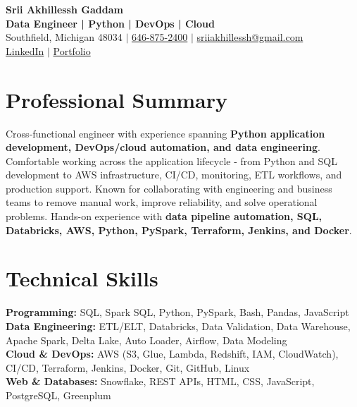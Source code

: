\documentclass[letterpaper,10pt]{article}
\begin{document}
\fontsize{9.35pt}{10.45pt}\selectfont

\begin{center}
    {\LARGE \textbf{Srii Akhillessh Gaddam}} \\[-1pt]
    \textbf{Data Engineer | Python | DevOps | Cloud} \\[2pt]
    Southfield, Michigan 48034 $|$
    \href{tel:6468752400}{646-875-2400} $|$
    \href{mailto:sriiakhillessh@gmail.com}{sriiakhillessh@gmail.com} \\[1pt]
    \href{https://www.linkedin.com/in/srii-akhiilessh-gaddam-b48668191/}{LinkedIn} $|$
    \href{https://sriiakhillesshg.github.io/portfolio/}{Portfolio}
\end{center}
\vspace{-8pt}

\section{Professional Summary}
\small{Cross-functional engineer with experience spanning \textbf{Python application development, DevOps/cloud automation, and data engineering}. Comfortable working across the application lifecycle - from Python and SQL development to AWS infrastructure, CI/CD, monitoring, ETL workflows, and production support. Known for collaborating with engineering and business teams to remove manual work, improve reliability, and solve operational problems. Hands-on experience with \textbf{data pipeline automation, SQL, Databricks, AWS, Python, PySpark, Terraform, Jenkins, and Docker}.}

\section{Technical Skills}
\small{
\textbf{Programming:} SQL, Spark SQL, Python, PySpark, Bash, Pandas, JavaScript \\
\textbf{Data Engineering:} ETL/ELT, Databricks, Data Validation, Data Warehouse, Apache Spark, Delta Lake, Auto Loader, Airflow, Data Modeling \\
\textbf{Cloud \& DevOps:} AWS (S3, Glue, Lambda, Redshift, IAM, CloudWatch), CI/CD, Terraform, Jenkins, Docker, Git, GitHub, Linux \\
\textbf{Web \& Databases:} Snowflake, REST APIs, HTML, CSS, JavaScript, PostgreSQL, Greenplum
}
\end{document}
